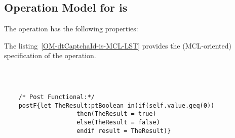 \subsection{Operation Model for is}

\label{OM-is}


The  operation has the following properties:

	\begin{operationmodel}



		


	\end{operationmodel}



	\vspace{1cm}
	The listing~\ref{OM-dtCaptchaId-is-MCL-LST} provides the \msrmessir (MCL-oriented) specification of the operation.
	
	\scriptsize
	\vspace{0.5cm}
	\begin{lstlisting}[style=MessirStyle,firstnumber=auto,captionpos=b,caption={\msrmessir (MCL-oriented) specification of the operation \emph{is}.},label=OM-dtCaptchaId-is-MCL-LST]

	
	
	/* Post Functional:*/ 
	postF{let TheResult:ptBoolean in(if(self.value.geq(0))
					then(TheResult = true)
					else(TheResult = false)
					endif result = TheResult)}
	
	
	\end{lstlisting}
	\normalsize 
	
	
	
	






